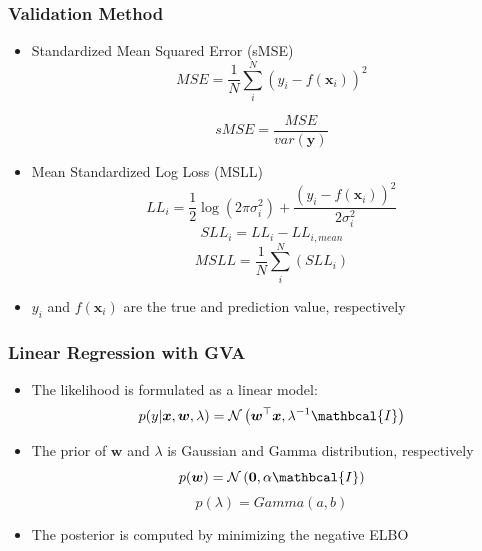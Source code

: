 \documentclass[xcolor=table]{beamer}
\begin{document}
\begin{frame}
\frametitle{Validation Method}
\centering

\begin{itemize}
\item Standardized Mean Squared Error (sMSE)
\begin{equation}
MSE = \frac{1}{N}\sum_i^N(y_i - f(\bm{x}_i))^2
\end{equation}

\begin{equation}
sMSE = \frac{MSE}{var(\bm{y})}
\end{equation}

\item Mean Standardized Log Loss (MSLL)
\begin{equation}
LL_i = \frac{1}{2}\log(2\pi\sigma_i^2) + \frac{(y_i - f(\bm{x}_i))^2}{2\sigma_i^2}
\end{equation}
\begin{equation}
SLL_i = LL_i - LL_{i,mean}
\end{equation}
\begin{equation}
MSLL = \frac{1}{N}\sum_i^N(SLL_i)
\end{equation}

\item $y_i$ and $f(\bm{x}_i)$ are the true and prediction value, respectively
\end{itemize}
\end{frame}


\begin{frame}
\frametitle{Linear Regression with GVA}
\begin{itemize}

\item The likelihood is formulated as a linear model:
\begin{equation}
p(y|\bm{x},\bm{w},\lambda) = \mathcal{N}\left(\bm{w}^\top \bm{x}, \lambda^{-1}\mathbcal{I}\right)
\end{equation}
\item The prior of $\bm{w}$ and $\lambda$ is Gaussian and Gamma distribution, respectively
\begin{equation}
p(\bm{w}) = \mathcal{N}\left(\bm{0}, \alpha\mathbcal{I}\right)
\end{equation}
\begin{equation}
p(\lambda) = \textit{Gamma}\left(a,b\right)
\end{equation}

\item The posterior is computed by minimizing the negative ELBO

\end{itemize}
\end{frame}
\end{document}
